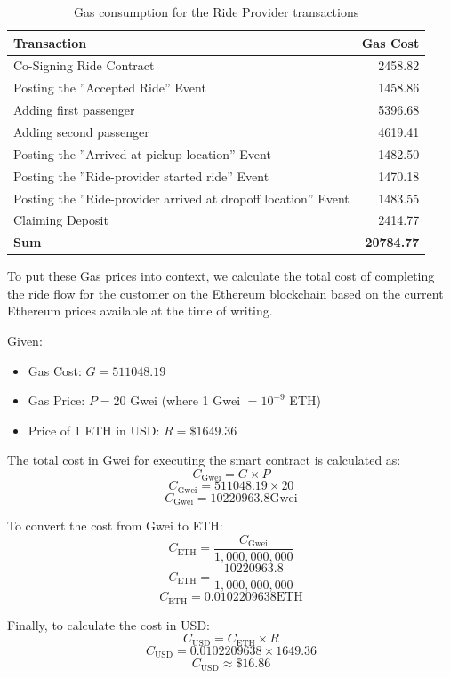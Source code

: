 \begin{table}[H]
\centering
\begin{tabular}{|l|r|}
\hline
\textbf{Transaction} & \textbf{Gas Cost} \\
\hline
Co-Signing Ride Contract & 2458.82 \\
\hline
Posting the ''Accepted Ride'' Event & 1458.86 \\
\hline
Adding first passenger  & 5396.68 \\
\hline
Adding second passenger & 4619.41 \\
\hline
Posting the ''Arrived at pickup location'' Event & 1482.50 \\
\hline
Posting the ''Ride-provider started ride'' Event & 1470.18 \\
\hline
Posting the ''Ride-provider arrived at dropoff location'' Event & 1483.55 \\
\hline
Claiming Deposit & 2414.77 \\
\hline
\hline
\textbf{Sum}  & \textbf{20784.77} \\
\hline
\end{tabular}
\caption{Gas consumption for the Ride Provider transactions}
\label{tab:gasRideProvider}
\end{table}

To put these Gas prices into context, we calculate the total cost of completing the ride flow for the customer on the Ethereum blockchain based on the current Ethereum prices available at the time of writing.

Given:
\begin{itemize}
    \item Gas Cost: \( G = 511048.19 \)
    \item Gas Price: \( P = 20 \) Gwei (where 1 Gwei \( = 10^{-9} \) ETH)
    \item Price of 1 ETH in USD: \( R = \$1649.36 \)
\end{itemize}

The total cost in Gwei for executing the smart contract is calculated as:
\[ C_{\text{Gwei}} = G \times P \]
\[ C_{\text{Gwei}} = 511048.19 \times 20 \]
\[ C_{\text{Gwei}} = 10220963.8 \text{Gwei} \]

To convert the cost from Gwei to ETH:
\[ C_{\text{ETH}} = \frac{C_{\text{Gwei}}}{1,000,000,000} \]
\[ C_{\text{ETH}} = \frac{10220963.8}{1,000,000,000} \]
\[ C_{\text{ETH}} = 0.0102209638 \text{ETH} \] 

Finally, to calculate the cost in USD:
\[ C_{\text{USD}} = C_{\text{ETH}} \times R \]
\[ C_{\text{USD}} = 0.0102209638 \times 1649.36 \]
\[ C_{\text{USD}} \approx \$16.86 \]

